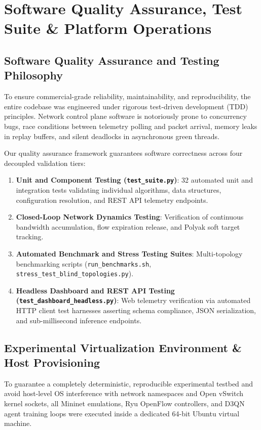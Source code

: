 \documentclass[12pt,a4paper,oneside]{report}
\begin{document}
\chapter{Software Quality Assurance, Test Suite \& Platform Operations}
\label{chap:verification}

\section{Software Quality Assurance and Testing Philosophy}
To ensure commercial-grade reliability, maintainability, and reproducibility, the entire codebase was engineered under rigorous test-driven development (TDD) principles. Network control plane software is notoriously prone to concurrency bugs, race conditions between telemetry polling and packet arrival, memory leaks in replay buffers, and silent deadlocks in asynchronous green threads.

Our quality assurance framework guarantees software correctness across four decoupled validation tiers:
\begin{enumerate}
    \item \textbf{Unit and Component Testing (\texttt{test\_suite.py})}: 32 automated unit and integration tests validating individual algorithms, data structures, configuration resolution, and REST API telemetry endpoints.
    \item \textbf{Closed-Loop Network Dynamics Testing}: Verification of continuous bandwidth accumulation, flow expiration release, and Polyak soft target tracking.
    \item \textbf{Automated Benchmark and Stress Testing Suites}: Multi-topology benchmarking scripts (\texttt{run\_benchmarks.sh}, \texttt{stress\_test\_blind\_topologies.py}).
    \item \textbf{Headless Dashboard and REST API Testing (\texttt{test\_dashboard\_headless.py})}: Web telemetry verification via automated HTTP client test harnesses asserting schema compliance, JSON serialization, and sub-millisecond inference endpoints.
\end{enumerate}

\section{Experimental Virtualization Environment \& Host Provisioning}
\label{sec:vm_environment}
To guarantee a completely deterministic, reproducible experimental testbed and avoid host-level OS interference with network namespaces and Open vSwitch kernel sockets, all Mininet emulations, Ryu OpenFlow controllers, and D3QN agent training loops were executed inside a dedicated 64-bit Ubuntu virtual machine.
\end{document}
